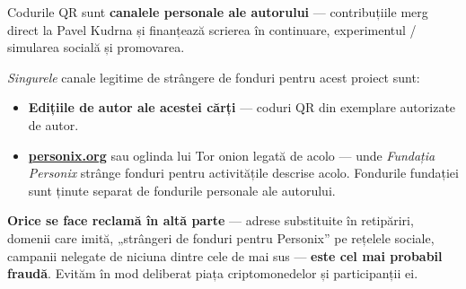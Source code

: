 \begin{minipage}[t]{0.60\textwidth}
\vspace{0pt}
\begin{mdframed}[
  linewidth=0.7pt,roundcorner=5pt,
  innerleftmargin=10pt,innerrightmargin=10pt,
  innertopmargin=8pt,innerbottommargin=8pt,
  skipabove=0pt,skipbelow=0pt,
  linecolor=cbwarning!50,backgroundcolor=cbwarning!5,
  nobreak=true,
  needspace=4\baselineskip,
]
\footnotesize
Codurile QR sunt \textbf{canalele personale ale autorului} --- contribuțiile merg direct la Pavel Kudrna și finanțează scrierea în continuare, experimentul / simularea socială și promovarea.

\smallskip
\emph{Singurele} canale legitime de strângere de fonduri pentru acest proiect sunt:

\smallskip
\begin{itemize}
\setlength{\itemsep}{0pt}
\setlength{\topsep}{0pt}
\item \textbf{Edițiile de autor ale acestei cărți} --- coduri QR din exemplare autorizate de autor.
\item \href{https://personix.org}{\textbf{personix.org}} sau oglinda lui Tor onion legată de acolo --- unde \emph{Fundația Personix} strânge fonduri pentru activitățile descrise acolo. Fondurile fundației sunt ținute separat de fondurile personale ale autorului.
\end{itemize}

\smallskip
\textbf{Orice se face reclamă în altă parte} --- adrese substituite în retipăriri, domenii care imită, „strângeri de fonduri pentru Personix” pe rețelele sociale, campanii nelegate de niciuna dintre cele de mai sus --- \textbf{este cel mai probabil fraudă}. Evităm în mod deliberat piața criptomonedelor și participanții ei.
\end{mdframed}
\end{minipage}

\clearpage
